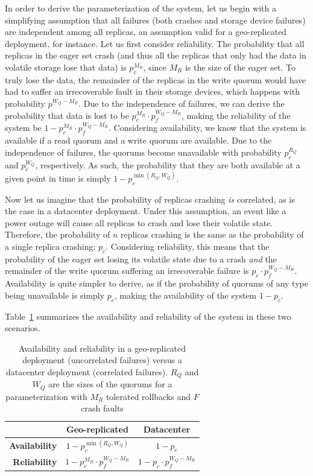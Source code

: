 In order to derive the parameterization of the system, let us
begin with a simplifying assumption that all failures (both
crashes and storage device failures) are independent among all
replicas, an assumption valid for a geo-replicated deployment,
for instance. Let us first consider reliability. The probability
that all replicas in the eager set crash (and thus all the
replicas that only had the data in volatile storage lose that
data) is $p_c^{M_R}$, since $M_R$ is the size of the eager set.
To truly lose the data, the remainder of the replicas in the
write quorum would have had to suffer an irrecoverable fault in
their storage devices, which happens with probability $p^{W_Q -
M_R}$. Due to the independence of failures, we can derive the
probability that data is lost to be $p_c^{M_R} \cdot p_f^{W_Q -
M_R}$, making the reliability of the system be $1 - p_c^{M_R}
\cdot p_f^{W_Q - M_R}$. Considering availability, we know that
the system is available if a read quorum and a write quorum are
available. Due to the independence of failures, the quorums
become unavailable with probability $p_c^{R_Q}$ and $p_c^{W_Q}$,
respectively. As such, the probability that they are both
available at a given point in time is simply $1 - p_c^{\min(R_Q,
W_Q)}$.

Now let us imagine that the probability of replicas crashing
\emph{is} correlated, as is the case in a datacenter deployment.
Under this assumption, an event like a power outage will cause
all replicas to crash and lose their volatile state. Therefore,
the probability of $n$ replicas crashing is the same as the
probability of a single replica crashing: $p_c$. Considering
reliability, this means that the probability of the eager set
losing its volatile state due to a crash \emph{and} the remainder
of the write quorum suffering an irrecoverable failure is $p_c
\cdot p_f^{W_Q - M_R}$. Availability is quite simpler to derive,
as if the probability of quorums of any type being unavailable is
simply $p_c$, making the availability of the system $1 - p_c$.

Table~\ref{tab:parameterization} summarizes the availability and
reliability of the system in these two scenarios.

\begin{table}[ht]
    \centering
    \caption{Availability and reliability in a geo-replicated
    deployment (uncorrelated failures) versus a datacenter
    deployment (correlated failures). $R_Q$ and $W_Q$
    are the sizes of the quorums for a parameterization with $M_R$
    tolerated rollbacks and $F$ crash faults}\label{tab:parameterization}
    \begin{tabular}{|r||c|c|}
        \hline
        & \textbf{Geo-replicated} & \textbf{Datacenter} \\ \hline
        \textbf{Availability} & $1 - p_c^{\min(R_Q, W_Q)}$ & $1 - p_c$ \\ \hline
        \textbf{Reliability}  & $1 - p_c^{M_R} \cdot p_f^{W_Q - M_R}$ & $1 - p_c \cdot p_f^{W_Q - M_R}$ \\ \hline
    \end{tabular}\label{tab:parameterization}
\end{table}

